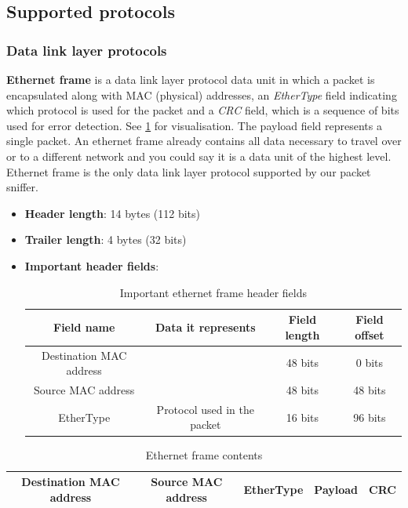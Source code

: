 \documentclass[a4paper]{article}
\begin{document}
  \vspace{1cm}


  \subsection{Supported protocols}

  \subsubsection{Data link layer protocols}

  \textbf{Ethernet frame} is a data link layer protocol data unit in 
  which a packet is encapsulated along with MAC (physical) addresses, 
  an \textit{EtherType} field indicating which protocol is used for the packet
  and a \textit{CRC} field, which is a sequence of bits used for error 
  detection. 
  See \ref{ethernet_frame} for visualisation. The payload field represents a 
  single packet. 
  An ethernet frame already contains all data necessary to travel over or to a 
  different network and you could say it is a data unit of the highest level.
  Ethernet frame is the only data link layer protocol supported by our packet 
  sniffer. 

  \begin{itemize}
    \item \textbf{Header length}: 14 bytes (112 bits)
    \item \textbf{Trailer length}: 4 bytes (32 bits)
    \item \textbf{Important header fields}:
      \begin{table}[h]
        \centering
        \begin{tabular}{|c|c|c|c|}
          \hline
          Field name & Data it represents & Field length & Field offset \\
          \hline
          \hline
          Destination MAC address & & 48 bits & 0 bits \\
          \hline
          Source MAC address & & 48 bits & 48 bits \\
          \hline
          EtherType & Protocol used in the packet & 16 bits & 96 bits \\
          \hline
        \end{tabular}
        \caption{Important ethernet frame header fields}
      \end{table}
  \end{itemize}

  \begin{table}[h]
    \centering
    \begin{tabular}{|c|c|c|c|c|}
      \hline
      Destination MAC address & Source MAC address & EtherType & 
        \textbf{Payload} & CRC \\
      \hline
    \end{tabular}
    \caption{Ethernet frame contents}
    \label{ethernet_frame}
  \end{table}
\end{document}
